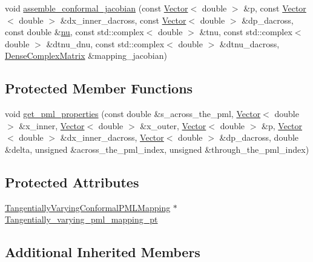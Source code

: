 \begin{DoxyCompactItemize}
\item 
void \hyperlink{classoomph_1_1TangentiallyVaryingConformal2DPMLElement_a3c2785570a7a8656fd49d3032b1aff8d}{assemble\+\_\+conformal\+\_\+jacobian} (const \hyperlink{classoomph_1_1Vector}{Vector}$<$ double $>$ \&p, const \hyperlink{classoomph_1_1Vector}{Vector}$<$ double $>$ \&dx\+\_\+inner\+\_\+dacross, const \hyperlink{classoomph_1_1Vector}{Vector}$<$ double $>$ \&dp\+\_\+dacross, const double \&\hyperlink{classoomph_1_1Conformal2DPMLElement_ab11344b74ec10ba88440e04ab95b7426}{nu}, const std\+::complex$<$ double $>$ \&tnu, const std\+::complex$<$ double $>$ \&dtnu\+\_\+dnu, const std\+::complex$<$ double $>$ \&dtnu\+\_\+dacross, \hyperlink{classoomph_1_1DenseComplexMatrix}{Dense\+Complex\+Matrix} \&mapping\+\_\+jacobian)
\end{DoxyCompactItemize}
\subsection*{Protected Member Functions}
\begin{DoxyCompactItemize}
\item 
void \hyperlink{classoomph_1_1TangentiallyVaryingConformal2DPMLElement_a68cdd899d050ccd22720b928d9fa901a}{get\+\_\+pml\+\_\+properties} (const double \&s\+\_\+across\+\_\+the\+\_\+pml, \hyperlink{classoomph_1_1Vector}{Vector}$<$ double $>$ \&x\+\_\+inner, \hyperlink{classoomph_1_1Vector}{Vector}$<$ double $>$ \&x\+\_\+outer, \hyperlink{classoomph_1_1Vector}{Vector}$<$ double $>$ \&p, \hyperlink{classoomph_1_1Vector}{Vector}$<$ double $>$ \&dx\+\_\+inner\+\_\+dacross, \hyperlink{classoomph_1_1Vector}{Vector}$<$ double $>$ \&dp\+\_\+dacross, double \&delta, unsigned \&across\+\_\+the\+\_\+pml\+\_\+index, unsigned \&through\+\_\+the\+\_\+pml\+\_\+index)
\end{DoxyCompactItemize}
\subsection*{Protected Attributes}
\begin{DoxyCompactItemize}
\item 
\hyperlink{classoomph_1_1TangentiallyVaryingConformalPMLMapping}{Tangentially\+Varying\+Conformal\+P\+M\+L\+Mapping} $\ast$ \hyperlink{classoomph_1_1TangentiallyVaryingConformal2DPMLElement_a20be46fe19da89f6f2c799509ab38491}{Tangentially\+\_\+varying\+\_\+pml\+\_\+mapping\+\_\+pt}
\end{DoxyCompactItemize}
\subsection*{Additional Inherited Members}


